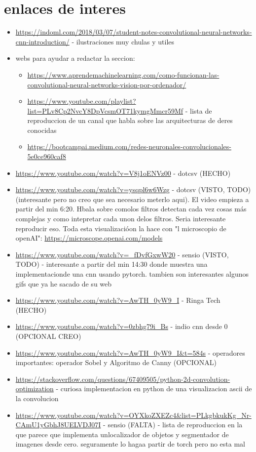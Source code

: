 \documentclass{article}
\begin{document}
\section{enlaces de interes}
\begin{itemize}
\item \url{https://indoml.com/2018/03/07/student-notes-convolutional-neural-networks-cnn-introduction/} - ilustraciones muy chulas y utiles

\item webs para ayudar a redactar la seccion:
\begin{itemize}
\item \url{https://www.aprendemachinelearning.com/como-funcionan-las-convolutional-neural-networks-vision-por-ordenador/}
\item \url{https://www.youtube.com/playlist?list=PLv8Cp2NvcY8DpVcsmOT71kymgMmcr59Mf} - lista de reproduccion de un canal que habla sobre las arquitecturas de deres conocidas
\item \url{https://bootcampai.medium.com/redes-neuronales-convolucionales-5e0ce960caf8}
\end{itemize}
\item \url{https://www.youtube.com/watch?v=V8j1oENVz00} - dotcsv (HECHO)
\item \url{https://www.youtube.com/watch?v=ysqpl6w6Wzg} - dotcsv (VISTO, TODO) (interesante pero no creo que sea necesario meterlo aqui). El video empieza a partir del min 6:20. Hbala sobre comolos filtros detectan cada vez cosas más complejas y como intepretar cada unon delos filtros. Seria interesante reproducir eso. Toda esta visualizacióon la hace con "l microscopio de openAI": \url{https://microscope.openai.com/models}
\item \url{https://www.youtube.com/watch?v=_fDvfGxwW20} - sensio (VISTO, TODO) - interesante a partir del min 14:30 donde muestra una implementacionde una cnn usando pytorch. tambien son interesantes algunos gifs que ya he sacado de su web
\item \url{https://www.youtube.com/watch?v=AwTH_0yW9_I} - Ringa Tech (HECHO)
\item \url{https://www.youtube.com/watch?v=0zbhg79i_Bs} - indio cnn desde 0 (OPCIONAL CREO)
\item \url{https://www.youtube.com/watch?v=AwTH_0yW9_I&t=584s} - operadores importantes: operador Sobel y Algoritmo de Canny (OPCIONAL)
\item \url{https://stackoverflow.com/questions/67409505/python-2d-convolution-optimization} - curiosa implementacion en python de una visualizacion ascii de la convolucion
\item \url{https://www.youtube.com/watch?v=OYXkoZXEZc4&list=PLkgbkukKg_Nr-CAmU1yGbhJ8UELVDJ07I} - sensio (FALTA) - lista de reproduccion en la que parece que implementa unlocalizador de objetos y segmentador de imagenes desde cero. seguramente lo hagaa partir de torch pero no esta mal
\end{itemize}
\end{document}

